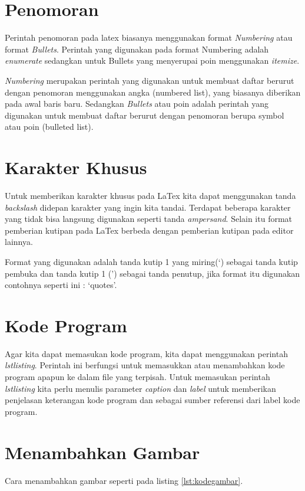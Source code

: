 \section{Penomoran}
Perintah penomoran pada latex biasanya menggunakan format \textit{Numbering} atau format \textit{Bullets}. Perintah yang digunakan pada format Numbering adalah \textit{enumerate} sedangkan untuk Bullets yang menyerupai poin menggunakan \textit{itemize}.
\par \textit{Numbering} merupakan perintah yang digunakan untuk membuat daftar berurut dengan penomoran menggunakan angka (numbered list), yang biasanya diberikan pada awal baris baru. Sedangkan \textit{Bullets} atau poin adalah perintah yang digunakan untuk membuat daftar berurut dengan penomoran berupa symbol atau poin (bulleted list).   

\section{Karakter Khusus}
Untuk memberikan karakter khusus pada LaTex kita dapat menggunakan tanda \textit{backslash} didepan karakter yang ingin kita tandai. Terdapat beberapa karakter yang tidak bisa langsung digunakan seperti tanda \textit{ampersand}. Selain itu format pemberian kutipan pada LaTex berbeda dengan pemberian kutipan pada editor lainnya.
\par Format yang digunakan adalah tanda kutip 1 yang miring(`) sebagai tanda kutip pembuka dan tanda kutip 1 (') sebagai tanda penutup, jika format itu digunakan contohnya seperti ini : `quotes'.


\section{Kode Program}
Agar kita dapat memasukan kode program, kita dapat menggunakan perintah \textit{lstlisting}. Perintah ini  berfungsi untuk memasukkan atau menambahkan kode program apapun ke dalam file yang terpisah. Untuk memasukan perintah \textit{lstlisting} kita perlu menulis parameter \textit{caption} dan \textit{label} untuk memberikan penjelasan keterangan kode program dan sebagai sumber referensi dari label kode program.



\section{Menambahkan Gambar}
Cara menambahkan gambar seperti pada listing \ref{lst:kodegambar}.



